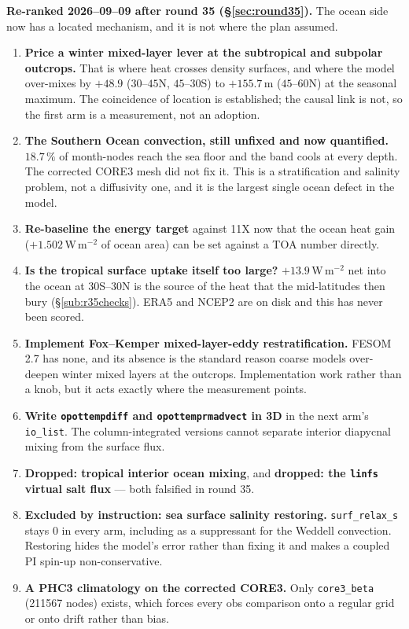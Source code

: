 \documentclass[10pt]{article}
\begin{document}
\textbf{Re-ranked 2026--09--09 after round 35 (\S\ref{sec:round35}).} The ocean side now
has a located mechanism, and it is not where the plan assumed.
\begin{enumerate}\itemsep2pt
\item \textbf{Price a winter mixed-layer lever at the subtropical and subpolar outcrops.}
That is where heat crosses density surfaces, and where the model over-mixes by $+48.9$
($30$--$45$N, $45$--$30$S) to $+155.7$\,m ($45$--$60$N) at the seasonal maximum. The
coincidence of location is established; the causal link is not, so the first arm is a
measurement, not an adoption.
\item \textbf{The Southern Ocean convection, still unfixed and now quantified.}
$18.7\,\%$ of month-nodes reach the sea floor and the band cools at every depth. The
corrected CORE3 mesh did not fix it. This is a stratification and salinity problem, not a
diffusivity one, and it is the largest single ocean defect in the model.
\item \textbf{Re-baseline the energy target} against 11X now that the ocean heat gain
($+1.502$\,W\,m$^{-2}$ of ocean area) can be set against a TOA number directly.
\item \textbf{Is the tropical surface uptake itself too large?} $+13.9$\,W\,m$^{-2}$ net
into the ocean at 30S--30N is the source of the heat that the mid-latitudes then bury
(\S\ref{sub:r35checks}). ERA5 and NCEP2 are on disk and this has never been scored.
\item \textbf{Implement Fox--Kemper mixed-layer-eddy restratification.} FESOM 2.7 has
none, and its absence is the standard reason coarse models over-deepen winter mixed layers
at the outcrops. Implementation work rather than a knob, but it acts exactly where the
measurement points.
\item \textbf{Write \texttt{opottempdiff} and \texttt{opottemprmadvect} in 3D} in the
next arm's \texttt{io\_list}. The column-integrated versions cannot separate interior
diapycnal mixing from the surface flux.
\item \textbf{Dropped: tropical interior ocean mixing}, and \textbf{dropped: the
\texttt{linfs} virtual salt flux} --- both falsified in round 35.
\item \textbf{Excluded by instruction: sea surface salinity restoring.}
\texttt{surf\_relax\_s} stays $0$ in every arm, including as a suppressant for the
Weddell convection. Restoring hides the model's error rather than fixing it and makes a
coupled PI spin-up non-conservative.
\item \textbf{A PHC3 climatology on the corrected CORE3.} Only \texttt{core3\_beta}
(211567 nodes) exists, which forces every obs comparison onto a regular grid or onto drift
rather than bias.
\end{enumerate}
\end{document}
